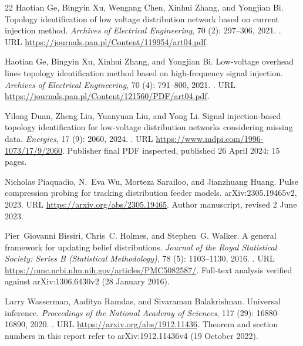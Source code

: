 \documentclass[UTF8,11pt,fontset=fandol]{ctexart}
\theoremstyle{remark}
\numberwithin{equation}{section}
\begin{document}
\begin{thebibliography}{22}
Haotian Ge, Bingyin Xu, Wengang Chen, Xinhui Zhang, and Yongjian Bi.
\newblock Topology identification of low voltage distribution network based on
  current injection method.
\newblock \emph{Archives of Electrical Engineering}, 70 (2):
  297--306, 2021{}.
\newblock {}.
\newblock URL \url{https://journals.pan.pl/Content/119954/art04.pdf}.

Haotian Ge, Bingyin Xu, Xinhui Zhang, and Yongjian Bi.
\newblock Low-voltage overhead lines topology identification method based on
  high-frequency signal injection.
\newblock \emph{Archives of Electrical Engineering}, 70 (4):
  791--800, 2021{}.
\newblock {}.
\newblock URL \url{https://journals.pan.pl/Content/121560/PDF/art04.pdf}.

Yilong Duan, Zheng Liu, Yuanyuan Liu, and Yong Li.
\newblock Signal injection-based topology identification for low-voltage
  distribution networks considering missing data.
\newblock \emph{Energies}, 17 (9): 2060, 2024.
\newblock {}.
\newblock URL \url{https://www.mdpi.com/1996-1073/17/9/2060}.
\newblock Publisher final PDF inspected, published 26 April 2024; 15 pages.

Nicholas Piaquadio, N.~Eva Wu, Morteza Sarailoo, and Jianzhuang Huang.
\newblock Pulse compression probing for tracking distribution feeder models.
\newblock arXiv:2305.19465v2, 2023.
\newblock URL \url{https://arxiv.org/abs/2305.19465}.
\newblock Author manuscript, revised 2 June 2023.

Pier~Giovanni Bissiri, Chris~C. Holmes, and Stephen~G. Walker.
\newblock A general framework for updating belief distributions.
\newblock \emph{Journal of the Royal Statistical Society: Series B (Statistical
  Methodology)}, 78 (5): 1103--1130, 2016.
\newblock {}.
\newblock URL \url{https://pmc.ncbi.nlm.nih.gov/articles/PMC5082587/}.
\newblock Full-text analysis verified against arXiv:1306.6430v2 (28 January
  2016).

Larry Wasserman, Aaditya Ramdas, and Sivaraman Balakrishnan.
\newblock Universal inference.
\newblock \emph{Proceedings of the National Academy of Sciences}, 117
  (29): 16880--16890, 2020.
\newblock {}.
\newblock URL \url{https://arxiv.org/abs/1912.11436}.
\newblock Theorem and section numbers in this report refer to
  arXiv:1912.11436v4 (19 October 2022).


\end{thebibliography}
\end{document}
